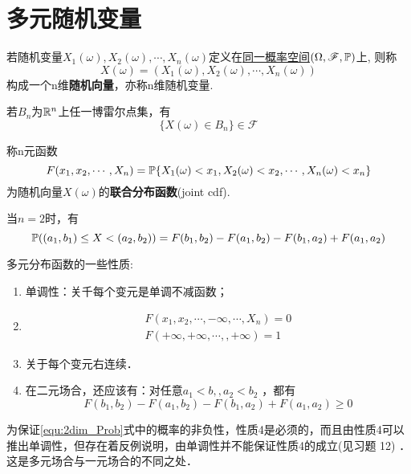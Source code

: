 \section{多元随机变量}

\begin{definition}[随机向量]
    若随机变量$X_1(\omega), X_2(\omega),\cdots , X_n(\omega)$定义在\underline{同一概率空间}$(\Omega,\mathscr{F},\P)$上, 则称
    \[ X(\omega) = (X_1(\omega), X_2(\omega),\cdots , X_n(\omega)) \]
    构成一个n维\textbf{随机向量}，亦称n维随机变量.
\end{definition}

\begin{proposition}
    若$B_n$为$\R^n$上任一博雷尔点集，有
    \[ \{ X(\omega) \in B_n \} \in \mathscr{F} \]
\end{proposition}

\begin{definition}
    称n元函数
    \[ F(x_1,x_2, \cdots , X_n)=\P \{ X_1(\omega)<x_1, X_2(\omega)<x_2,\cdots , X_n(\omega)<x_n \} \]
    为随机向量$X(\omega)$的\textbf{联合分布函数}(joint cdf).
\end{definition}

当$n=2$时，有
\begin{equation}\label{equ:2dim_Prob}
    \P((a_1,b_1)\le X < (a_2,b_2))=F(b_1,b_2)-F(a_1,b_2)-F(b_1,a_2)+F(a_1,a_2)
\end{equation}

\begin{property}
    多元分布函数的一些性质:
    \begin{enumerate}
        \item 单调性：关千每个变元是单调不减函数；
        \item \begin{align*}
                  F(x_1,x_2, \cdots, -\infty, \cdots, X_n)=0 \\
                  F(+\infty,+\infty, \cdots, , +\infty)=1
              \end{align*}
        \item 关于每个变元右连续．
        \item 在二元场合，还应该有：对任意$ a_1 <b,,a_2<b_2$ ，都有
              \[ F(b_1,b_2)-F(a_1,b_2)-F(b_1,a_2)+F(a_1,a_2)\ge 0   \]
    \end{enumerate}
\end{property}

为保证\ref{equ:2dim_Prob}式中的概率的非负性，性质4是必须的，而且由性质4可以推出单调性，但存在着反例说明，由单调性并不能保证性质4的成立(见习题 12) ．这是多元场合与一元场合的不同之处．

